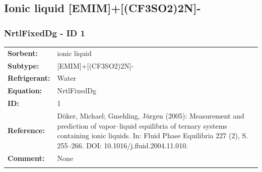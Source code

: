 \subsection{Ionic liquid [EMIM]+[(CF3SO2)2N]-}
%
\subsubsection{NrtlFixedDg - ID 1}
%
\begin{tabular}[l]{|lp{11.5cm}|}
\hline
\addlinespace

\textbf{Sorbent:} & ionic liquid \\
\textbf{Subtype:} & [EMIM]+[(CF3SO2)2N]- \\
\textbf{Refrigerant:} & Water \\
\textbf{Equation:} & NrtlFixedDg \\
\textbf{ID:} & 1 \\
\textbf{Reference:} & Döker, Michael; Gmehling, Jürgen (2005): Measurement and prediction of vapor–liquid equilibria of ternary systems containing ionic liquids. In: Fluid Phase Equilibria 227 (2), S. 255–266. DOI: 10.1016/j.fluid.2004.11.010. \\
\textbf{Comment:} & None \\

\addlinespace
\hline
\end{tabular}
\newline

